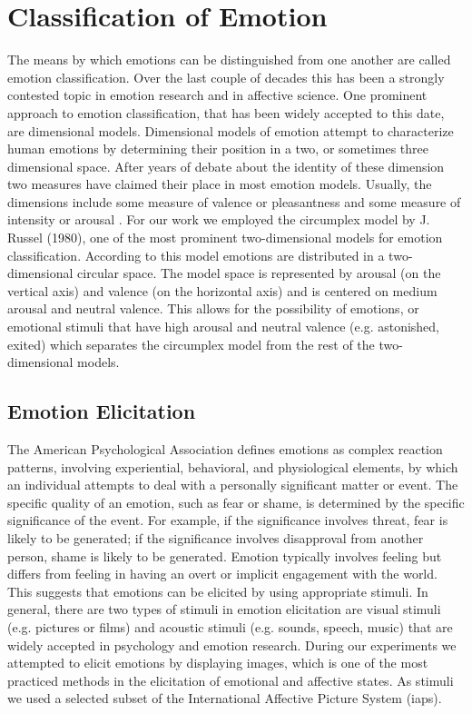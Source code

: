 \section{Classification of Emotion}\label{emoclass}
The means by which emotions can be distinguished from one another are called emotion classification. Over the last couple of decades this has been a strongly contested topic in emotion research and in affective science. One prominent approach to emotion classification, that has been widely accepted to this date, are dimensional models. Dimensional models of emotion attempt to characterize human emotions by determining their position in a two, or sometimes three dimensional space. After years of debate about the identity of these dimension two measures have claimed their place in most emotion models. Usually, the dimensions include some measure of valence or pleasantness and some measure of intensity or arousal \cite{Rubin2009}. For our work we employed the circumplex model by J. Russel (1980), one of the most prominent two-dimensional models for emotion classification. According to this model emotions are distributed in a two-dimensional circular space. The model space is represented by arousal (on the vertical axis) and valence (on the horizontal axis) and is centered on medium arousal and neutral valence. This allows for the possibility of emotions, or emotional stimuli that have high arousal and neutral valence (e.g. astonished, exited) \cite{Rubin2009} which separates the circumplex model from the rest of the two-dimensional models.

\subsection{Emotion Elicitation}
The American Psychological Association defines emotions as complex reaction patterns, involving experiential, behavioral, and physiological elements, by which an individual attempts to deal with a personally significant matter or event. The specific quality of an emotion, such as fear or shame, is determined by the specific significance of the event. For example, if the significance involves threat, fear is likely to be generated; if the significance involves disapproval from another person, shame is likely to be generated. Emotion typically involves feeling but differs from feeling in having an overt or implicit engagement with the world. This suggests that emotions can be elicited by using appropriate stimuli. In general, there are two types of stimuli in emotion elicitation are visual stimuli (e.g. pictures or films) and acoustic stimuli (e.g. sounds, speech, music) that are widely accepted in psychology and emotion research. During our experiments we attempted to elicit emotions by displaying images, which is one of the most practiced methods in the elicitation of emotional and affective states. As stimuli we used a selected subset of the International Affective Picture System (\gls{iaps}).


